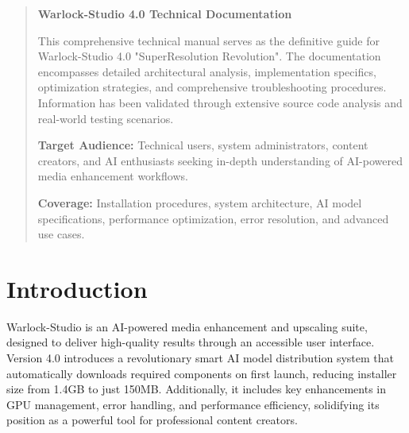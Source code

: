 \documentclass[11pt, a4paper]{article}
\begin{document}
\begin{abstract}
\noindent %
\textbf{Warlock-Studio 4.0 Technical Documentation}

This comprehensive technical manual serves as the definitive guide for Warlock-Studio 4.0 "SuperResolution Revolution". The documentation encompasses detailed architectural analysis, implementation specifics, optimization strategies, and comprehensive troubleshooting procedures. Information has been validated through extensive source code analysis and real-world testing scenarios.

\textbf{Target Audience:} Technical users, system administrators, content creators, and AI enthusiasts seeking in-depth understanding of AI-powered media enhancement workflows.

\textbf{Coverage:} Installation procedures, system architecture, AI model specifications, performance optimization, error resolution, and advanced use cases.
\end{abstract}

\newpage %
\tableofcontents %
\newpage %



\section{Introduction}
Warlock-Studio is an AI-powered media enhancement and upscaling suite, designed to deliver high-quality results through an accessible user interface. Version 4.0 introduces a revolutionary smart AI model distribution system that automatically downloads required components on first launch, reducing installer size from 1.4GB to just 150MB. Additionally, it includes key enhancements in GPU management, error handling, and performance efficiency, solidifying its position as a powerful tool for professional content creators.
\end{document}
